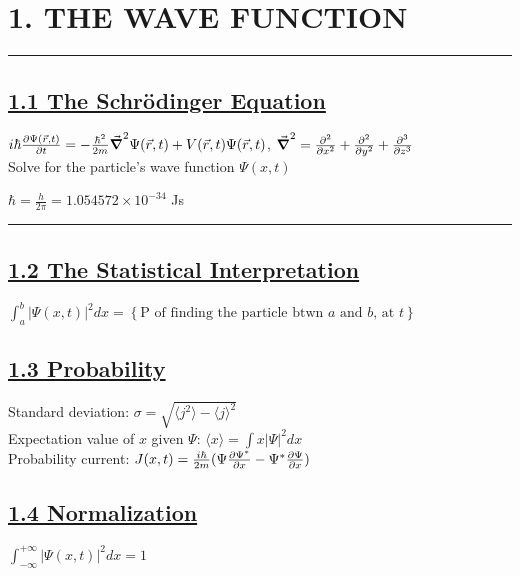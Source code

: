 \section{1. THE WAVE FUNCTION} \hrule height 0.3pt \thinspace

\subsection{\underline{1.1 The Schr\"{o}dinger Equation}}

$i \hbar \pdv{\Psi(\vec{r}, t)}{t} = -\frac{\hbar^2}{2m} \vec{\grad}^2 \Psi(\vec{r}, t) + V(\vec{r}, t) \Psi(\vec{r}, t)$,
$\vec{\grad}^2 = \pdv[2]{}{x} + \pdv[2]{}{y} + \pdv[3]{}{z}$ \\

Solve for the particle's wave function $\Psi(x, t)$

$\hbar = \frac{h}{2\pi} = 1.054572 \times 10^{-34}$ Js \\

\smallskip \hrule height 0.3pt

\subsection{\underline{1.2 The Statistical Interpretation}}

$\int_{a}^{b} |\Psi(x, t)|^2 dx = \left\{ \textrm{P of finding the particle btwn $a$ and $b$, at $t$} \right\}$ \\

\subsection{\underline{1.3 Probability}}
Standard deviation: $\sigma = \sqrt{\langle j^2 \rangle - \langle j \rangle ^2}$ \\
Expectation value of $x$ given $\Psi$: $\langle x \rangle = \int x |\Psi|^2 dx$ \\
Probability current: $J(x, t)=\frac{i \hbar}{2m} (\Psi \pdv{\Psi^*}{x} - \Psi^* \pdv{\Psi}{x})$

\subsection{\underline{1.4 Normalization}}

$\int_{-\infty}^{+\infty} |\Psi (x, t)|^2 dx = 1$ \\

